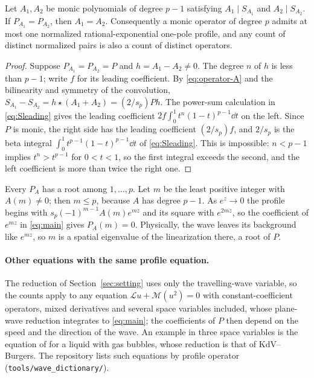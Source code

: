 \begin{proposition}\label{prop:injective}
Let \(A_1,A_2\) be monic polynomials of degree \(p-1\) satisfying
\(A_1\mid S_{A_1}\) and \(A_2\mid S_{A_2}\). If \(P_{A_1}=P_{A_2}\),
then \(A_1=A_2\). Consequently a monic operator of degree \(p\) admits
at most one normalized rational-exponential one-pole profile, and any
count of distinct normalized pairs is also a count of distinct operators.
\end{proposition}

\begin{proof}
Suppose \(P_{A_1}=P_{A_2}=P\) and \(h=A_1-A_2\ne0\). The degree \(n\) of
\(h\) is less than \(p-1\); write \(f\) for its leading coefficient. By
\eqref{eq:operator-A} and the bilinearity and symmetry of the
convolution, \(S_{A_1}-S_{A_2}=h\star(A_1+A_2)=(2/s_p)Ph\). The
power-sum calculation in \eqref{eq:Sleading} gives the leading
coefficient \(2f\int_0^1t^n(1-t)^{p-1}\dd t\) on the left. Since \(P\)
is monic, the right side has the leading coefficient \((2/s_p)f\), and
\(2/s_p\) is the beta integral \(\int_0^1t^{p-1}(1-t)^{p-1}\dd t\) of
\eqref{eq:Sleading}. This is impossible: \(n<p-1\) implies
\(t^n>t^{p-1}\) for \(0<t<1\), so the first integral exceeds the second,
and the left coefficient is more than twice the right one.
\end{proof}

Every \(P_A\) has a root among \(1,\ldots,p\). Let \(m\) be the least
positive integer with \(A(m)\ne0\); then \(m\le p\), because \(A\) has
degree \(p-1\). As \(e^z\to0\) the profile begins with
\(s_p(-1)^{m-1}A(m)e^{mz}\) and its square with \(e^{2mz}\), so the
coefficient of \(e^{mz}\) in \eqref{eq:main} gives \(P_A(m)=0\).
Physically, the wave leaves its background like \(e^{mz}\), so \(m\) is
a spatial eigenvalue of the linearization there, a root of \(P\).

\paragraph{Other equations with the same profile equation.}
The reduction of Section~\ref{sec:setting} uses only the travelling-wave
variable, so the counts apply to any equation
\(\mathcal L u+\mathcal M(u^2)=0\) with constant-coefficient operators,
mixed derivatives and several space variables included, whose plane-wave
reduction integrates to \eqref{eq:main}; the coefficients of \(P\) then
depend on the speed and the direction of the wave. An example in three
space variables is the equation of
\citet{KudryashovSinelshchikovThreeDim2012} for a liquid with gas
bubbles, whose reduction is that of KdV--Burgers. The repository lists
such equations by profile operator (\texttt{tools/wave\_dictionary/}).

